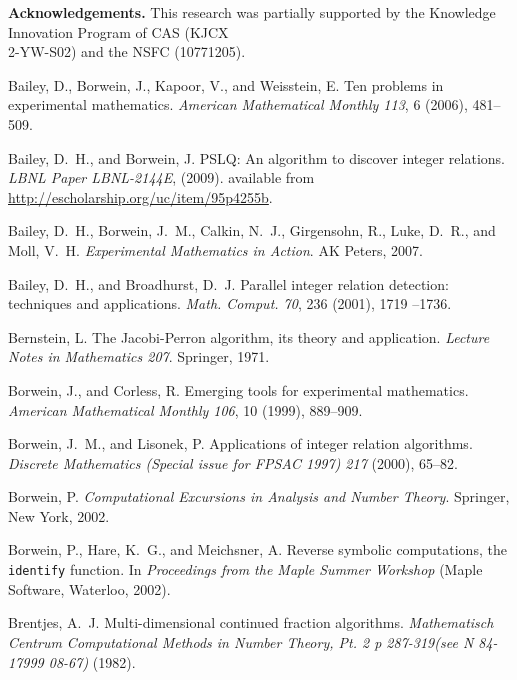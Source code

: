 \documentclass{sig-alternate}
\numberwithin{theorem}{section} \numberwithin{equation}{section}
\begin{document}
\textbf{Acknowledgements.} This research was partially supported by
the Knowledge Innovation Program of CAS (KJCX\\2-YW-S02) and the NSFC (10771205).

\begin{thebibliography}{10}

{\sc Bailey, D., Borwein, J., Kapoor, V., and Weisstein, E.}  {Ten
problems in experimental mathematics}. {\em American Mathematical
Monthly 113}, 6 (2006), 481--509.

{\sc Bailey, D.~H., and Borwein, J.}
  PSLQ: An algorithm to discover integer relations.
  {\em LBNL Paper LBNL-2144E}, (2009). available from  \url{http://escholarship.org/uc/item/95p4255b}.

{\sc Bailey, D.~H., Borwein, J.~M., Calkin, N.~J., Girgensohn, R.,
Luke, D.~R., and Moll, V.~H.}
  {\em Experimental Mathematics in Action}.
  AK Peters, 2007.

{\sc Bailey, D.~H., and Broadhurst, D.~J.} Parallel integer relation
detection: techniques and applications. {\em Math. Comput. 70}, 236
(2001), 1719 --1736.

{\sc Bernstein, L.}
  The Jacobi-Perron algorithm, its theory and application.
  {\em Lecture Notes in Mathematics 207}. Springer, 1971.

{\sc Borwein, J., and Corless, R.}
  {Emerging tools for experimental mathematics}.
  {\em American Mathematical Monthly 106}, 10 (1999), 889--909.

{\sc Borwein, J.~M., and Lisonek, P.}
  Applications of integer relation algorithms.
  {\em Discrete Mathematics (Special issue for FPSAC 1997) 217\/}
  (2000), 65--82.

{\sc Borwein, P.}
  {\em Computational Excursions in Analysis and Number Theory}.
  Springer, New York, 2002.

{\sc Borwein, P., Hare, K.~G., and Meichsner, A.}
  Reverse symbolic computations, the {\tt identify} function.
  In {\em Proceedings from the Maple Summer Workshop\/} (Maple
  Software, Waterloo, 2002).

{\sc Brentjes, A.~J.}
  Multi-dimensional continued fraction algorithms.
  {\em Mathematisch Centrum Computational Methods in Number Theory, Pt.
  2 p 287-319(see N 84-17999 08-67)\/} (1982).




\end{thebibliography}
\end{document}
